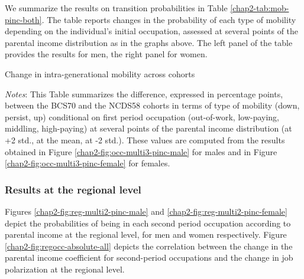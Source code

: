 We summarize the results on transition probabilities in Table \ref{chap2-tab:mob-pinc-both}. The table reports changes in the probability of each type of mobility depending on the individual’s initial occupation, assessed at several points of the parental income distribution as in the graphs above. The left panel of the table provides the results for men, the right panel for women.
\begin{table}[!tb]
    \centering
    \caption{Change in intra-generational mobility across cohorts}
    \label{chap2-tab:mob-pinc-both}
    \begin{threeparttable}
        \setlength{\tabcolsep}{9pt}
        
            \begin{tablenotes}[flushleft]
                \footnotesize{\item \textit{Notes}: This Table summarizes the difference, expressed in percentage points, between the BCS70 and the NCDS58 cohorts in terms of type of mobility (down, persist, up) conditional on first period occupation (out-of-work, low-paying, middling, high-paying) at several points of the parental income distribution (at +2 std., at the mean, at -2 std.). These values are computed from the results obtained in Figure \ref{chap2-fig:occ-multi3-pinc-male} for males and in Figure \ref{chap2-fig:occ-multi3-pinc-female} for females.}
            \end{tablenotes}
    \end{threeparttable}
\end{table}

\subsubsection{Results at the regional level}\label{chap2-app-additional-regional}

Figures \ref{chap2-fig:reg-multi2-pinc-male} and \ref{chap2-fig:reg-multi2-pinc-female} depict the probabilities of being in each second period occupation according to parental income at the regional level, for men and women respectively. Figure  \ref{chap2-fig:regocc-absolute-all} depicts the correlation between the change in the parental income coefficient for second-period occupations and the change in job polarization at the regional level.

